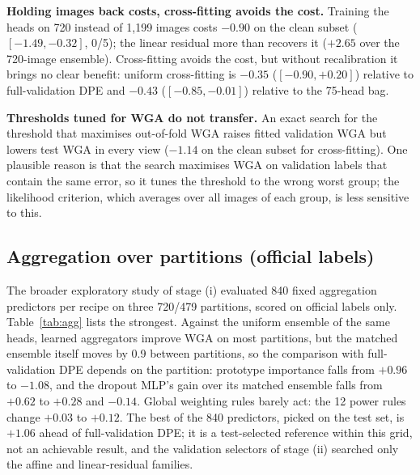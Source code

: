 \textbf{Holding images back costs, cross-fitting avoids the cost.} Training the heads on 720 instead of 1,199 images costs $-0.90$\pp{} on the clean subset ($[-1.49,-0.32]$, 0/5); the linear residual more than recovers it ($+2.65$\pp{} over the 720-image ensemble). Cross-fitting avoids the cost, but without recalibration it brings no clear benefit: uniform cross-fitting is $-0.35$\pp{} ($[-0.90,+0.20]$) relative to full-validation DPE and $-0.43$\pp{} ($[-0.85,-0.01]$) relative to the 75-head bag.

\textbf{Thresholds tuned for WGA do not transfer.} An exact search for the threshold that maximises out-of-fold WGA raises fitted validation WGA but lowers test WGA in every view ($-1.14$\pp{} on the clean subset for cross-fitting). One plausible reason is that the search maximises WGA on validation labels that contain the same error, so it tunes the threshold to the wrong worst group; the likelihood criterion, which averages over all images of each group, is less sensitive to this.

\subsection{Aggregation over partitions (official labels)}
\label{sec:agg}
The broader exploratory study of stage (i) evaluated 840 fixed aggregation predictors per recipe on three 720/479 partitions, scored on official labels only. Table~\ref{tab:agg} lists the strongest. Against the uniform ensemble of the same heads, learned aggregators improve WGA on most partitions, but the matched ensemble itself moves by 0.9\pp{} between partitions, so the comparison with full-validation DPE depends on the partition: prototype importance falls from $+0.96$ to $-1.08$\pp, and the dropout MLP's gain over its matched ensemble falls from $+0.62$ to $+0.28$ and $-0.14$\pp. Global weighting rules barely act: the 12 power rules change $+0.03$ to $+0.12$\pp. The best of the 840 predictors, picked on the test set, is $+1.06$\pp{} ahead of full-validation DPE; it is a test-selected reference within this grid, not an achievable result, and the validation selectors of stage (ii) searched only the affine and linear-residual families.

